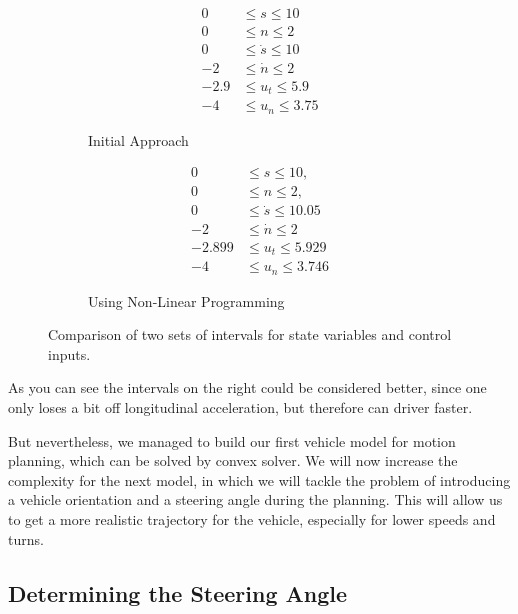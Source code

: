 \begin{figure}[h]
	\centering
	\begin{subfigure}[b]{0.45\textwidth}
		\centering
		\begin{align*}
			0    & \leq s \leq 10       \\
			0    & \leq n \leq 2        \\
			0    & \leq \dot{s} \leq 10 \\
			-2   & \leq \dot{n} \leq 2  \\
			-2.9 & \leq u_t \leq 5.9    \\
			-4   & \leq u_n \leq 3.75
		\end{align*}
		\caption{Initial Approach}
	\end{subfigure}
	\hfill
	\begin{subfigure}[b]{0.45\textwidth}
		\centering
		\begin{align*}
			0      & \leq s \leq 10,         \\
			0      & \leq n \leq 2,          \\
			0      & \leq \dot{s} \leq 10.05 \\
			-2     & \leq \dot{n} \leq 2     \\
			-2.899 & \leq u_t \leq 5.929     \\
			-4     & \leq u_n \leq 3.746
		\end{align*}
		\caption{Using Non-Linear Programming}
	\end{subfigure}
	\caption{Comparison of two sets of intervals for state variables and control inputs.}
\end{figure}

As you can see the intervals on the right could be considered better, since one only loses a bit off longitudinal acceleration, but therefore can
driver faster.

But nevertheless, we managed to build our first vehicle model for motion planning, which can be solved by convex solver.
We will now increase the complexity for the next model, in which we will tackle the problem of introducing a vehicle orientation and a steering angle
during the planning.
This will allow us to get a more realistic trajectory for the vehicle, especially for lower speeds and turns.

\subsection{Determining the Steering Angle} \label{subsec:determining_the_steering_angle}


